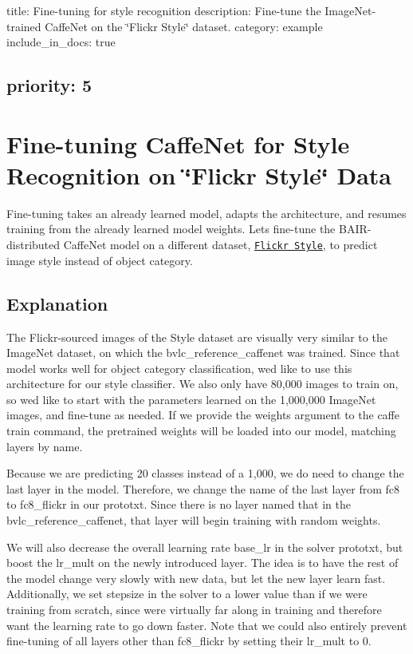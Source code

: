 

 title\+: Fine-\/tuning for style recognition description\+: Fine-\/tune the Image\+Net-\/trained Caffe\+Net on the \char`\"{}\+Flickr Style\char`\"{} dataset. category\+: example include\+\_\+in\+\_\+docs\+: true \subsection*{priority\+: 5 }

\section*{Fine-\/tuning Caffe\+Net for Style Recognition on \char`\"{}\+Flickr Style\char`\"{} Data}

Fine-\/tuning takes an already learned model, adapts the architecture, and resumes training from the already learned model weights. Let\textquotesingle{}s fine-\/tune the B\+A\+I\+R-\/distributed Caffe\+Net model on a different dataset, \href{http://sergeykarayev.com/files/1311.3715v3.pdf}{\tt Flickr Style}, to predict image style instead of object category.

\subsection*{Explanation}

The Flickr-\/sourced images of the Style dataset are visually very similar to the Image\+Net dataset, on which the {\ttfamily bvlc\+\_\+reference\+\_\+caffenet} was trained. Since that model works well for object category classification, we\textquotesingle{}d like to use this architecture for our style classifier. We also only have 80,000 images to train on, so we\textquotesingle{}d like to start with the parameters learned on the 1,000,000 Image\+Net images, and fine-\/tune as needed. If we provide the {\ttfamily weights} argument to the {\ttfamily caffe train} command, the pretrained weights will be loaded into our model, matching layers by name.

Because we are predicting 20 classes instead of a 1,000, we do need to change the last layer in the model. Therefore, we change the name of the last layer from {\ttfamily fc8} to {\ttfamily fc8\+\_\+flickr} in our prototxt. Since there is no layer named that in the {\ttfamily bvlc\+\_\+reference\+\_\+caffenet}, that layer will begin training with random weights.

We will also decrease the overall learning rate {\ttfamily base\+\_\+lr} in the solver prototxt, but boost the {\ttfamily lr\+\_\+mult} on the newly introduced layer. The idea is to have the rest of the model change very slowly with new data, but let the new layer learn fast. Additionally, we set {\ttfamily stepsize} in the solver to a lower value than if we were training from scratch, since we\textquotesingle{}re virtually far along in training and therefore want the learning rate to go down faster. Note that we could also entirely prevent fine-\/tuning of all layers other than {\ttfamily fc8\+\_\+flickr} by setting their {\ttfamily lr\+\_\+mult} to 0.

